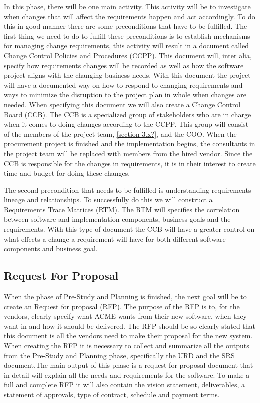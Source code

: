 \documentclass[a4paper]{article}
\begin{document}
In this phase, there will be one main activity. This activity will be to investigate when changes that will affect the requirements happen and act accordingly. To do this in good manner there are some preconditions that have to be fulfilled\cite{gott282}. The first thing we need to do to fulfill these preconditions is to establish mechanisms for managing change requirements, this activity will result in a document called Change Control Policies and Procedures (CCPP). This document will, inter alia, specify how requirements changes will be recorded as well as how the software project aligns with the changing business needs. With this document the project will have a documented way on how to respond to changing requirements and ways to minimize the disruption to the project plan in whole when changes are needed. When specifying this document we will also create a Change Control Board (CCB). The CCB is a specialized group of stakeholders who are in charge when it comes to doing changes according to the CCPP. This group will consist of the members of the project team, \ref{section 3.x?}, and the COO. When the procurement project is finished and the implementation begins, the consultants in the project team will be replaced with members from the hired vendor. Since the CCB is responsible for the changes in requirements, it is in their interest to create time and budget for doing these changes.

The second precondition that needs to be fulfilled is understanding requirements lineage and relationships. To successfully do this we will construct a Requirements Trace Matrices (RTM). The RTM will specifies the correlation between software and implementation components, business goals and the requirements. With this type of document the CCB will have a greater control on what effects a change a requirement will have for both different software components and business goal. 

\subsection{Request For Proposal}
\label{sub:request_for_propsal}
When the phase of Pre-Study and Planning is finished, the next goal will be to create an Request for proposal (RFP). The purpose of the RFP is to, for the vendors, clearly specify what ACME wants from their new software, when they want in and how it should be delivered\cite{SPM34}. The RFP should be so clearly stated that this document is all the vendors need to make their proposal for the new system. 
When creating the RFP it is necessary to collect and summarize all the outputs from the Pre-Study and Planning phase, specifically the URD and the SRS document.The main output of this phase is a request for proposal document that in detail will explain all the needs and requirements for the software. To make a full and complete RFP it will also contain the vision statement, deliverables, a statement of approvals, type of contract, schedule and payment terms\cite{SPM3536}.
\end{document}
